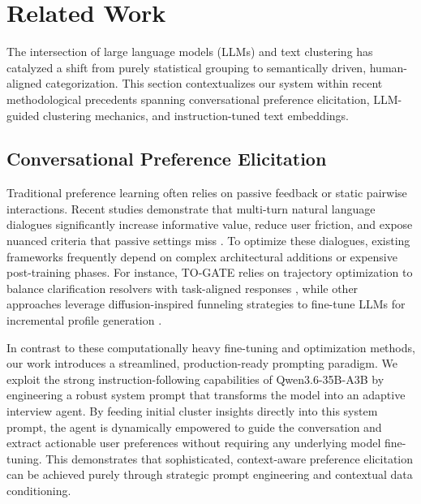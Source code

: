 \section{Related Work}
\label{sec:related_work}

The intersection of large language models (LLMs) and text clustering has catalyzed a shift from purely statistical grouping to semantically driven, human-aligned categorization. 
This section contextualizes our system within recent methodological precedents spanning conversational preference elicitation, LLM-guided clustering mechanics, and instruction-tuned text embeddings.

\subsection{Conversational Preference Elicitation}
Traditional preference learning often relies on passive feedback or static pairwise interactions. 
Recent studies demonstrate that multi-turn natural language dialogues significantly increase informative value, reduce user friction, and expose nuanced criteria that passive settings miss \cite{eliciting_human_preferences}. 
To optimize these dialogues, existing frameworks frequently depend on complex architectural additions or expensive post-training phases. 
For instance, TO-GATE relies on trajectory optimization to balance clarification resolvers with task-aligned responses \cite{to_gate}, while other approaches leverage diffusion-inspired funneling strategies to fine-tune LLMs for incremental profile generation \cite{asking_clarifying_questions}.

In contrast to these computationally heavy fine-tuning and optimization methods, our work introduces a streamlined, production-ready prompting paradigm. 
We exploit the strong instruction-following capabilities of Qwen3.6-35B-A3B \cite{qwen3.6} by engineering a robust system prompt that transforms the model into an adaptive interview agent. 
By feeding initial cluster insights directly into this system prompt, the agent is dynamically empowered to guide the conversation and extract actionable user preferences without requiring any underlying model fine-tuning. 
This demonstrates that sophisticated, context-aware preference elicitation can be achieved purely through strategic prompt engineering and contextual data conditioning.

